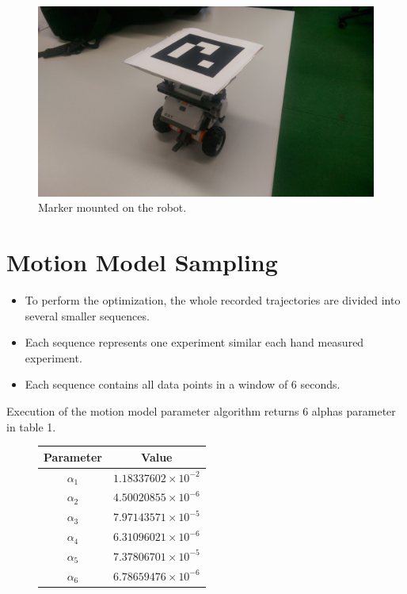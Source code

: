 \documentclass[paper=a4, fontsize=11pt]{scrartcl} %
\begin{document}
	\begin{figure}[H]
        \begin{center}
            \setlength{\fboxsep}{0.5pt} %
            \setlength{\fboxrule}{0.5pt}
            \includegraphics[width=12cm,fbox]{images/marker_robot.jpg}
            \caption{Marker mounted on the robot.}
        \end{center}
    \end{figure}
    
    \newpage
    \section{Motion Model Sampling}
    \begin{itemize}
	    \item To perform the optimization, the whole recorded trajectories are divided into several smaller sequences.
	    \item Each sequence represents one experiment similar each hand measured experiment.
	    \item Each sequence contains all data points in a window of 6 seconds. 
    \end{itemize}
    
    Execution of the motion model parameter algorithm returns 6 alphas parameter in table 1.
    \begin{figure}[h!]
        \centering
        \def\arraystretch{1.5}
        \begin{tabular}{|c|c|}
            \hline
            Parameter & Value \\
            \hline
            $\alpha_1$ & $1.18337602\times 10 ^{-2}$ \\
            $\alpha_2$ & $4.50020855\times 10 ^{-6}$ \\
            $\alpha_3$ & $7.97143571\times 10 ^{-5}$ \\
            $\alpha_4$ & $6.31096021\times 10 ^{-6}$ \\
            $\alpha_5$ & $7.37806701\times 10 ^{-5}$ \\
            $\alpha_6$ & $6.78659476\times 10 ^{-6}$ \\
            \hline
        \end{tabular}
    \end{figure}
\end{document}
